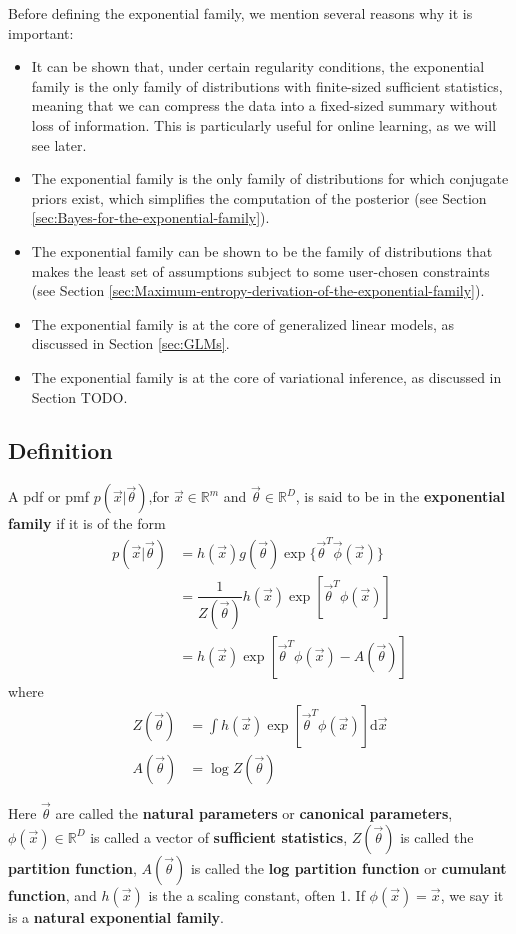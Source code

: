 Before defining the exponential family, we mention several reasons why it is important:
\begin{itemize}
	\item{It can be shown that, under certain regularity conditions, the exponential family is the only family of distributions with finite-sized sufficient statistics, meaning that we can compress the data into a fixed-sized summary without loss of information. This is particularly useful for online learning, as we will see later.}
	\item{The exponential family is the only family of distributions for which conjugate priors exist, which simplifies the computation of the posterior (see Section \ref{sec:Bayes-for-the-exponential-family}).}
	\item{The exponential family can be shown to be the family of distributions that makes the least set of assumptions subject to some user-chosen constraints (see Section \ref{sec:Maximum-entropy-derivation-of-the-exponential-family}).}
	\item{The exponential family is at the core of generalized linear models, as discussed in Section \ref{sec:GLMs}.}
	\item{The exponential family is at the core of variational inference, as discussed in Section TODO.}
\end{itemize}


\subsection{Definition}
A pdf or pmf $p(\vec{x}|\vec{\theta})$,for $\vec{x} \in \mathbb{R}^m$ and $\vec{\theta} \in \mathbb{R}^D$, is said to be in the \textbf{exponential family} if it is of the form
\begin{align}
p(\vec{x}|\vec{\theta}) 
&= h(\vec{x})g(\vec{\theta})\exp\{\vec{\theta}^T\vec{\phi}(\vec{x})\} \\
&=\dfrac{1}{Z(\vec{\theta})}h(\vec{x})\exp[\vec{\theta}^T\phi(\vec{x})] \\
& = h(\vec{x})\exp[\vec{\theta}^T\phi(\vec{x})-A(\vec{\theta})] \label{eqn:exponential-family}
\end{align}
where
\begin{align}
Z(\vec{\theta}) & =\int h(\vec{x})\exp[\vec{\theta}^T\phi(\vec{x})]\mathrm{d}\vec{x} \\
A(\vec{\theta}) & =\log Z(\vec{\theta})
\end{align}

Here $\vec{\theta}$ are called the \textbf{natural parameters} or \textbf{canonical parameters}, $\phi(\vec{x}) \in \mathbb{R}^D$ is called a vector of \textbf{sufficient statistics}, $Z(\vec{\theta})$ is called the \textbf{partition function}, $A(\vec{\theta})$ is called the \textbf{log partition function} or \textbf{cumulant function}, and $h(\vec{x})$ is the a scaling constant, often 1. If $\phi(\vec{x})=\vec{x}$, we say it is a \textbf{natural exponential family}.

